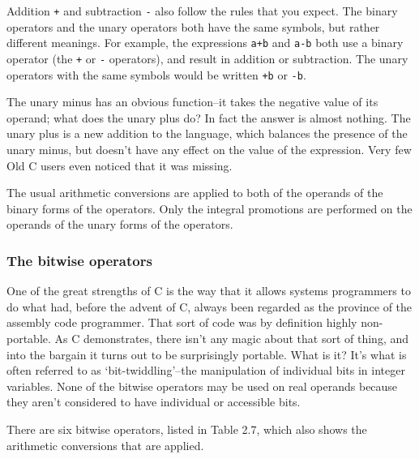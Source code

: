     Addition \texttt{+} and subtraction \texttt{-} also
     follow the rules that you expect. The binary operators and the unary
     operators both have the same symbols, but rather different meanings. For
     example, the expressions \texttt{a+b} and \texttt{a-b}
     both use a binary operator (the \texttt{+}
     or \texttt{-} operators), and result in addition or subtraction.
     The unary operators with the same symbols would be
     written \texttt{+b} or \texttt{-b}.


    The unary minus has an obvious function--it takes the negative
     value of its operand; what does the unary plus do? In fact the answer is
     almost nothing. The unary plus is a new addition to the language, which
     balances the presence of the unary minus, but doesn't have any effect on
     the value of the expression. Very few Old C users even noticed that
     it was missing.


    The usual arithmetic conversions are applied to both of the operands of
     the binary forms of the operators. Only the integral promotions are
     performed on the operands of the unary forms of the operators.


   

   \subsubsection{The bitwise operators}
    

    One of the great strengths of C is the way that it allows systems
     programmers to do what had, before the advent of C, always been
     regarded as the province of the assembly code programmer. That sort of
     code was by definition highly non-portable. As C demonstrates, there
     isn't any magic about that sort of thing, and into the bargain it turns
     out to be surprisingly portable. What is it? It's what is often referred
     to as `bit-twiddling'--the manipulation of individual bits in
     integer variables. None of the bitwise operators may be used on real
     operands because they aren't considered to have individual or accessible
     bits.


    There are six bitwise operators, listed in Table 2.7,
     which also shows the arithmetic conversions that are applied.


